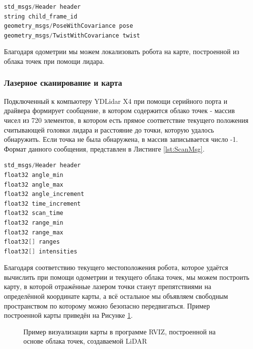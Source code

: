 \documentclass[12pt,a4paper]{scrartcl}
\begin{document}
					\begin{lstlisting}[language=C,caption={Формат сообщения nav\_msgs/Odometry\cite{bib:ROSOdometryMsg}},label={lst:OdometryMsg}]
std_msgs/Header header
string child_frame_id
geometry_msgs/PoseWithCovariance pose
geometry_msgs/TwistWithCovariance twist
					\end{lstlisting}				
					
					Благодаря одометрии мы можем локализовать робота на карте, построенной из облака точек при помощи лидара.
				\subsubsection{Лазерное сканирование и карта}
					Подключенный к компьютеру YDLidar X4 при помощи серийного порта и драйвера формирует сообщение, в котором содержится облако точек - массив чисел из 720 элементов, в котором есть прямое соответствие текущего положения считывающей головки лидара и расстояние до точки, которую удалось обнаружить. Если точка не была обнаружена, в массив записывается число -1. Формат данного сообщения, представлен в Листинге \ref{lst:ScanMsg}.
					
					\begin{lstlisting}[language=C,caption={Формат сообщения sensor\_msgs/LaserScan\cite{bib:ROSScanMsg}},label={lst:ScanMsg}]
std_msgs/Header header
float32 angle_min
float32 angle_max
float32 angle_increment
float32 time_increment
float32 scan_time
float32 range_min
float32 range_max
float32[] ranges
float32[] intensities
					\end{lstlisting}	
					
					Благодаря соответствию текущего местоположения робота, которое удаётся вычислить при помощи одометрии и текущего облака точек, мы можем построить карту, в которой отражённые лазером точки станут препятствиями на определённой координате карты, а всё остальное мы объявляем свободным пространством по которому можно безопасно передвигаться. Пример построенной карты приведён на Рисунке \ref{fig:MapExample}. 
					
					\begin{figure}[h]
						\caption{Пример визуализации карты в программе RVIZ, построенной на основе облака точек, создаваемой LiDAR\cite{bib:ROSMapExample}}
						\label{fig:MapExample}
					\end{figure}	
					
\end{document}
